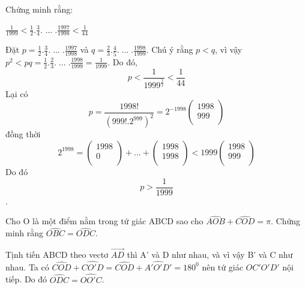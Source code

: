 \begin{baitap}
Chứng minh rằng:

 $\frac{1}{{1999}} < \frac{1}{2}.\frac{3}{4}.\,\,...\;.\frac{{1997}}{{1998}} < \frac{1}{{44}}$

\begin{loigiai3}
 Đặt $p = \frac{1}{2}.\frac{3}{4}.\;...\;.\frac{{1997}}{{1998}}$ và $q = \frac{2}{3}.\frac{4}{5}.\;...\;.\frac{{1998}}{{1999}}$. Chú ý rằng $p<q$, vì vậy $p^2  < pq = \frac{1}{2}.\frac{2}{3}.\;...\;.\frac{{1998}}{{1999}} = \frac{1}{{1999}}$. Do đó, 
\[ p < \frac{1}{{1999^{\frac{1}{2}} }} < \frac{1}{{44}}\] 
Lại có \[p = \frac{{1998!}}{{\left( {999!.2^{999} } \right)^2 }} = 2^{ - 1998} \left( \begin{array}{c}
 1998 \\ 
 999 \\ 
 \end{array} \right)
\] 
đồng thời 
\[
2^{1998}  = \left( \begin{array}{c}
 1998 \\ 
 0 \\ 
 \end{array} \right) + ... + \left( \begin{array}{l}
 1998 \\ 
 1998 \\ 
 \end{array} \right) < 1999\left( \begin{array}{c}
 1998 \\ 
  999 \\ 
 \end{array} \right)
\]
Do đó \[p > \frac{1}{{1999}}\].
\end{loigiai3}
\end{baitap}

\begin{baitap}
Cho O là một điểm nằm trong tứ giác ABCD sao cho $\widehat{AOB} + \widehat{COD} = \pi $. Chứng minh rằng
$\widehat{OBC} = \widehat{ODC}$.

\begin{loigiai3}
 Tịnh tiến ABCD theo vectơ $\overrightarrow {AD} $ thì A' và D như nhau, và vì vậy B' và C như nhau. 
Ta có $\widehat{COD} + \widehat{CO'D} = \widehat{COD} + \widehat{A'O'D'} = 180^0 $ nên tứ giác $OC'O'D'$ nội tiếp. Do đó  $\widehat{ODC} = \widehat{OO'C}$. 
\end{loigiai3}
\end{baitap}

